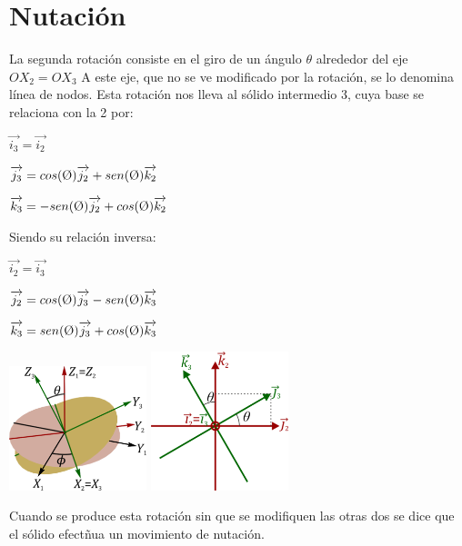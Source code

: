 \documentclass[12pt,a4paper]{report}
\begin{document}
\section{Nutación}
La segunda rotación consiste en el giro de un ángulo $\theta$ alrededor del eje $OX_{2}=OX_{3}$ A este eje, que no se ve modificado por la rotación, se lo denomina línea de nodos. Esta rotación nos lleva al sólido intermedio 3, cuya base se relaciona con la 2 por:
\begin{center}
$\overrightarrow{i_{3}}=\overrightarrow{i_{2}}$

$\overrightarrow{j_{3}}=cos(\textrm \O)\overrightarrow{j_{2}}+sen(\textrm \O)\overrightarrow{k_{2}}$

$\overrightarrow{k_{3}}=-sen(\textrm \O)\overrightarrow{j_{2}}+cos(\textrm \O)\overrightarrow{k_{2}}$
\end{center}
Siendo su relación inversa:
\begin{center}
$\overrightarrow{i_{2}}=\overrightarrow{i_{3}}$

$\overrightarrow{j_{2}}=cos(\textrm \O)\overrightarrow{j_{3}}-sen(\textrm \O)\overrightarrow{k_{3}}$

$\overrightarrow{k_{3}}=sen(\textrm \O)\overrightarrow{j_{3}}+cos(\textrm \O)\overrightarrow{k_{3}}$
\end{center}
\begin{center}
\includegraphics[width=4cm]{4.png}
\includegraphics[width=4cm]{5.png} 

Cuando se produce esta rotación sin que se modifiquen las otras dos se dice que el sólido efectñua un movimiento de nutación.
\end{center} 
\end{document}
